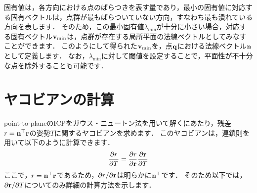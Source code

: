 固有値は，各方向における点のばらつきを表す量であり，最小の固有値に対応する固有ベクトルは，点群が最もばらついていない方向，すなわち最も潰れている方向を表します．
そのため，この最小固有値$\lambda_{\min}$が十分に小さい場合，対応する固有ベクトル${\bf v}_{\min}$は，点群が存在する局所平面の法線ベクトルとしてみなすことができます．
このようにして得られた${\bf v}_{\min}$を，点${\bf q}$における法線ベクトル${\bf n}$として定義します．
なお，$\lambda_{\min}$に対して閾値を設定することで，平面性が不十分な点を除外することも可能です．










\section{ヤコビアンの計算}
\label{subsec:point_to_plane_jacobian}

point-to-planeのICPをガウス・ニュートン法を用いて解くにあたり，残差$r = {\bf n}^{\top} {\bf r}$の姿勢$T$に関するヤコビアンを求めます．
このヤコビアンは，連鎖則を用いて以下のように計算できます．
%
\begin{align}
  \frac{ \partial r }{ \partial T } = \frac{ \partial r }{ \partial {\bf r} }
                                      \frac{ \partial {\bf r} }{ \partial T }
\end{align}
%
ここで，$r = {\bf n}^{\top} {\bf r}$であるため，$\partial r / \partial {\bf r}$は明らかに${\bf n}^{\top}$です．
そのため以下では，$\partial {\bf r} / \partial T$についてのみ詳細の計算方法を示します．

